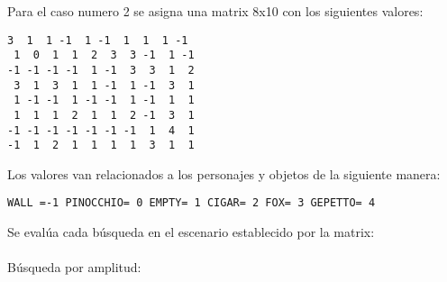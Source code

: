 
Para el caso numero 2 se asigna una matrix 8x10 con los siguientes valores:
\begin{lstlisting}[style=myStyle]
 3  1  1 -1  1 -1  1  1  1 -1
 1  0  1  1  2  3  3 -1  1 -1
-1 -1 -1 -1  1 -1  3  3  1  2
 3  1  3  1  1 -1  1 -1  3  1
 1 -1 -1  1 -1 -1  1 -1  1  1
 1  1  1  2  1  1  2 -1  3  1
-1 -1 -1 -1 -1 -1 -1  1  4  1
-1  1  2  1  1  1  1  3  1  1

\end{lstlisting}
Los valores van relacionados a los personajes y objetos de la siguiente manera:
\begin{lstlisting}[style=myStyle]
WALL =-1 PINOCCHIO= 0 EMPTY= 1 CIGAR= 2 FOX= 3 GEPETTO= 4
\end{lstlisting}
Se evalúa cada búsqueda en el escenario establecido por la matrix:\\\\
Búsqueda por amplitud:\\

